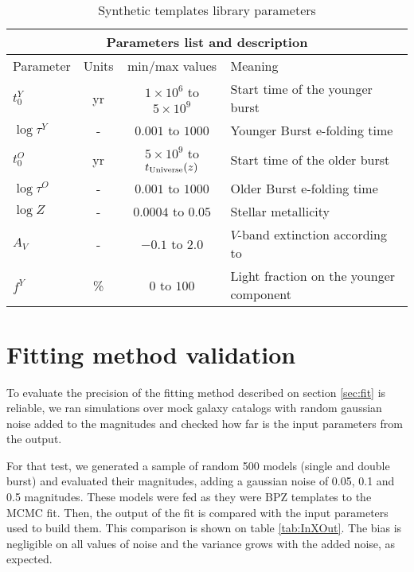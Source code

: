 \documentclass[a4paper, useAMS, usenatbib, hyperpdf]{mn2e}
\begin{document}
\begin{table*}							
\begin{centering}							
\begin{tabular}{lccl}							
\multicolumn{4}{c}{Parameters list and description}\\ \hline							
Parameter	&	Units	&	min/max values	&	Meaning	\\ \hline
$t_0^{Y}$	&	yr	&	$1 \times 10^6$ to $5 \times 10^9$	&	Start time of the younger burst	\\
$\log \tau^{Y}$	&	-	&	$0.001$ to $1000$	& Younger Burst e-folding time	\\
$t_0^{O}$	&	yr	&	$5 \times 10^9$ to $t_{\rm Universe} (z)$	&	Start time of the older burst	\\
$\log \tau^{O}$	&	-	&	$0.001$ to $1000$	& Older Burst e-folding time	\\
$\log Z$	&	-	&	$0.0004$ to $0.05$	&	Stellar metallicity	\\
$A_V$	&	-	&	$-0.1$ to $2.0$	&	$V$-band extinction according to \cite{Cardelli.Clayton.Mathis.1989a}	\\
$f^{Y}$	&	\%	&	$0$ to $100$	&	Light fraction on the younger component	\\
\hline							
\end{tabular}							
\end{centering}							
\caption{Synthetic templates library parameters}							
\label{tab:ListOfParameters}							
\end{table*}							


\section{Fitting method validation}
\label{sec:validation}

To evaluate the precision of the fitting method described on section \ref{sec:fit} is reliable, we ran simulations over mock galaxy catalogs with random gaussian noise added to the magnitudes and checked how far is the input parameters from the output.

For that test, we generated a sample of random 500 models (single and double burst) and evaluated their magnitudes, adding a gaussian noise of 0.05, 0.1 and 0.5 magnitudes. These models were fed as they were BPZ templates to the MCMC fit. Then, the output of the fit is compared with the input parameters used to build them. This comparison is shown on table \ref{tab:InXOut}. The bias is negligible on all values of noise and the variance grows with the added noise, as expected.
\end{document}

